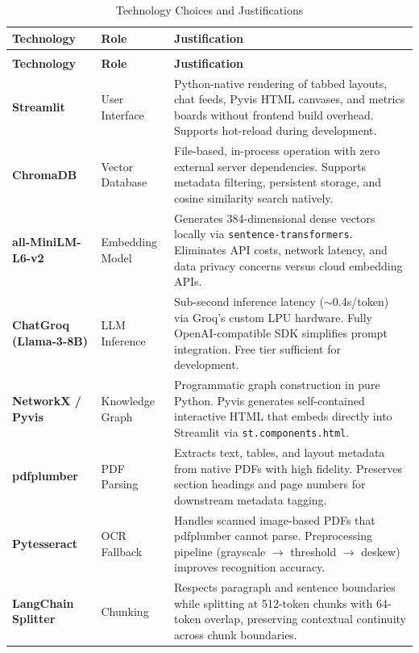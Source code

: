 \documentclass[12pt,a4paper]{article}
\begin{document}
\begin{longtable}{>{\bfseries}p{3.2cm} p{2.8cm} p{7cm}}
\caption{Technology Choices and Justifications} \\
\toprule
\textbf{Technology} & \textbf{Role} & \textbf{Justification} \\
\midrule
\endfirsthead
\multicolumn{3}{c}{\tablename\ \thetable{} -- continued} \\
\toprule
\textbf{Technology} & \textbf{Role} & \textbf{Justification} \\
\midrule
\endhead
\bottomrule
\endfoot
Streamlit & User Interface & Python-native rendering of tabbed layouts, chat feeds, Pyvis HTML canvases, and metrics boards without frontend build overhead. Supports hot-reload during development. \\[0.4em]
ChromaDB & Vector Database & File-based, in-process operation with zero external server dependencies. Supports metadata filtering, persistent storage, and cosine similarity search natively. \\[0.4em]
all-MiniLM-L6-v2 & Embedding Model & Generates 384-dimensional dense vectors locally via \texttt{sentence-transformers}. Eliminates API costs, network latency, and data privacy concerns versus cloud embedding APIs. \\[0.4em]
ChatGroq (Llama-3-8B) & LLM Inference & Sub-second inference latency ($\sim$0.4s/token) via Groq's custom LPU hardware. Fully OpenAI-compatible SDK simplifies prompt integration. Free tier sufficient for development. \\[0.4em]
NetworkX / Pyvis & Knowledge Graph & Programmatic graph construction in pure Python. Pyvis generates self-contained interactive HTML that embeds directly into Streamlit via \texttt{st.components.html}. \\[0.4em]
pdfplumber & PDF Parsing & Extracts text, tables, and layout metadata from native PDFs with high fidelity. Preserves section headings and page numbers for downstream metadata tagging. \\[0.4em]
Pytesseract & OCR Fallback & Handles scanned image-based PDFs that pdfplumber cannot parse. Preprocessing pipeline (grayscale $\rightarrow$ threshold $\rightarrow$ deskew) improves recognition accuracy. \\[0.4em]
LangChain Splitter & Chunking & Respects paragraph and sentence boundaries while splitting at 512-token chunks with 64-token overlap, preserving contextual continuity across chunk boundaries. \\
\end{longtable}
\end{document}
